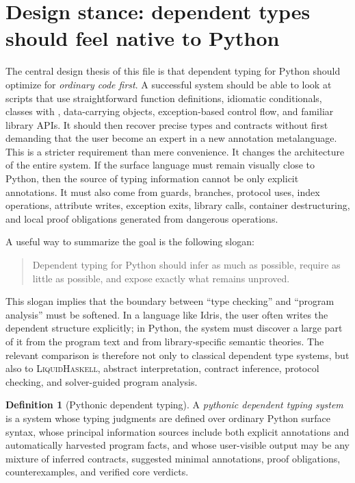 \documentclass[11pt]{article}
\newcommand{\LiquidHaskell}{\textsc{LiquidHaskell}}
\newcommand{\py}[1]{\texttt{\detokenize{#1}}}
\theoremstyle{definition}
\newtheorem{definition}{Definition}[section]
\theoremstyle{plain}
\begin{document}
\section{Design stance: dependent types should feel native to Python}

The central design thesis of this file is that dependent typing for Python
should optimize for \emph{ordinary code first}. A successful system should be
able to look at scripts that use straightforward function definitions, idiomatic
conditionals, classes with \py{__init__}, data-carrying objects, exception-based
control flow, and familiar library APIs. It should then recover precise types
and contracts without first demanding that the user become an expert in a new
annotation metalanguage. This is a stricter requirement than mere convenience.
It changes the architecture of the entire system. If the surface language must
remain visually close to Python, then the source of typing information cannot be
only explicit annotations. It must also come from guards, branches, protocol
uses, index operations, attribute writes, exception exits, library calls,
container destructuring, and local proof obligations generated from dangerous
operations.

A useful way to summarize the goal is the following slogan:
\begin{quote}
Dependent typing for Python should infer as much as possible, require as little
as possible, and expose exactly what remains unproved.
\end{quote}
This slogan implies that the boundary between ``type checking'' and ``program
analysis'' must be softened. In a language like Idris, the user often writes the
dependent structure explicitly; in Python, the system must discover a large part
of it from the program text and from library-specific semantic theories. The
relevant comparison is therefore not only to classical dependent type systems,
but also to \LiquidHaskell{}, abstract interpretation, contract inference,
protocol checking, and solver-guided program analysis.

\begin{definition}[Pythonic dependent typing]
A \emph{pythonic dependent typing system} is a system whose typing judgments are
defined over ordinary Python surface syntax, whose principal information sources
include both explicit annotations and automatically harvested program facts, and
whose user-visible output may be any mixture of inferred contracts, suggested
minimal annotations, proof obligations, counterexamples, and verified core
verdicts.
\end{definition}
\end{document}
